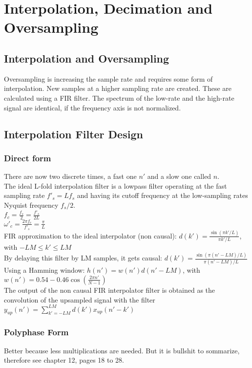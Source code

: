 \section{Interpolation, Decimation and Oversampling}
\subsection{Interpolation and Oversampling}
Oversampling is increasing the sample rate and requires some form of interpolation. New samples at a higher sampling rate are created. These are calculated using a FIR filter. The spectrum of the low-rate and the high-rate signal are identical, if the frequency axis is not normalized.

\subsection{Interpolation Filter Design}
\subsubsection{Direct form}
There are now two discrete times, a fast one $n'$ and a slow one called $n$.\\
The ideal L-fold interpolation filter is a lowpass filter operating at the fast sampling rate $f'_s=Lf_s$ and having its cutoff frequency at the low-sampling rates Nyquist frequency $f_s/2$.\\
$f_c=\frac{f_s}{2}=\frac{f'_s}{2L}$\\
$\omega'_c=\frac{2\pi f_c}{f'_s}=\frac{\pi}{L}$\\
FIR approximation to the ideal interpolator (non causal): $d(k')=\frac{\sin(\pi k'/L)}{\pi k'/L}$, with $-LM\leq k'\leq LM$\\
By delaying this filter by LM samples, it gets causal: $d(k')=\frac{\sin(\pi (n'-LM)/L)}{\pi (n'-LM)/L}$\\
Using a Hamming window: $h(n')=w(n')d(n'-LM)$, with $w(n') = 0.54-0.46\cos(\frac{2\pi n'}{N-1})$\\
The output of the non causal FIR interpolator filter is obtained as the convolution of the upsampled signal with the filter $y_{up}(n') = \sum\limits_{k'=-LM}^{LM}d(k')x_{up}(n'-k')$\\
\subsubsection{Polyphase Form}
Better because less multiplications are needed. But it is bullshit to sommarize, therefore see chapter 12, pages 18 to 28.

